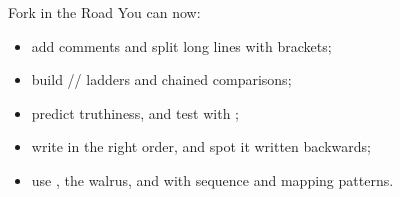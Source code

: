 \begin{achievement}{Fork in the Road}
You can now:
\begin{itemize}
\item add comments and split long lines with brackets;
\item build // ladders and chained comparisons;
\item predict truthiness, and test  with ;
\item write  in the right order, and spot it written backwards;
\item use , the walrus, and  with sequence and mapping patterns.
\end{itemize}
\end{achievement}
